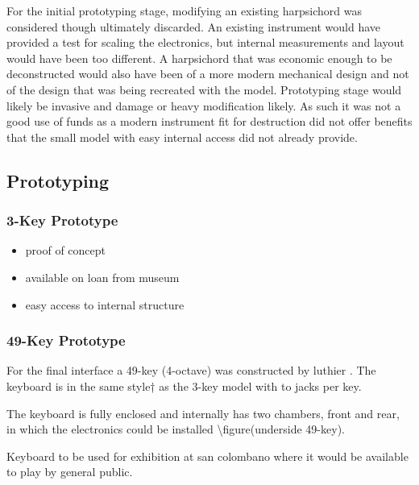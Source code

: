 
For the initial prototyping stage, modifying an existing harpsichord was
considered though ultimately discarded. An existing instrument would
have provided a test for scaling the electronics, but internal
measurements and layout would have been too different. A harpsichord that
was economic enough to be deconstructed would also have been of a more
modern mechanical design and not of the design that was being recreated
with the model. Prototyping stage would likely be invasive and damage or
heavy modification likely. As such it was not a good use of funds as a
modern instrument fit for destruction did not offer benefits that the
small model with easy internal access did not already provide.

\subsection{Prototyping}\label{prototyping}

\subsubsection{3-Key Prototype}\label{key-prototype}

\begin{itemize}
\item
  proof of concept
\item
  available on loan from museum
\item
  easy access to internal structure
\end{itemize}

\subsubsection{49-Key Prototype}\label{key-prototype-1}

For the final interface a 49-key (4-octave) was constructed by luthier
. The keyboard is in the same style† as the 3-key model with
to jacks per key.

The keyboard is fully enclosed and internally has two chambers, front
and rear, in which the electronics could be installed
\textbackslash figure(underside 49-key).

Keyboard to be used for exhibition at san colombano where it would be
available to play by general public.

